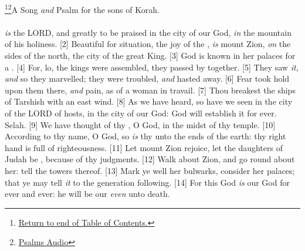 \footnote{\textcolor[cmyk]{0.99998,1,0,0}{\hyperlink{TOC}{Return to end of Table of Contents.}}}\footnote{\href{https://www.audioverse.org/english/audiobibles/books/ENGKJV/O/Ps/1}{\textcolor[cmyk]{0.99998,1,0,0}{Psalms Audio}}}\textcolor[cmyk]{0.99998,1,0,0}{A Song \emph{and} Psalm for the sons of Korah.}\\
\\
\textcolor[cmyk]{0.99998,1,0,0}{ \emph{is} the LORD, and greatly to be praised in the city of our God, \emph{in} the mountain of his holiness.}
[2] \textcolor[cmyk]{0.99998,1,0,0}{Beautiful for situation, the joy of the , \emph{is} mount Zion, \emph{on} the sides of the north, the city of the great King.}
[3] \textcolor[cmyk]{0.99998,1,0,0}{God is known in her palaces for a .}
[4] \textcolor[cmyk]{0.99998,1,0,0}{For, lo, the kings were assembled, they passed by together.}
[5] \textcolor[cmyk]{0.99998,1,0,0}{They saw \emph{it,} \emph{and} so they marvelled; they were troubled, \emph{and} hasted away.}
[6] \textcolor[cmyk]{0.99998,1,0,0}{Fear took hold upon them there, \emph{and} pain, as of a woman in travail.}
[7] \textcolor[cmyk]{0.99998,1,0,0}{Thou breakest the ships of Tarshish with an east wind.}
[8] \textcolor[cmyk]{0.99998,1,0,0}{As we have heard, so have we seen in the city of the LORD of hosts, in the city of our God: God will establish it for ever. Selah.}
[9] \textcolor[cmyk]{0.99998,1,0,0}{We have thought of thy , O God, in the midst of thy temple.}
[10] \textcolor[cmyk]{0.99998,1,0,0}{According to thy name, O God, so \emph{is} thy  unto the ends of the earth: thy right hand is full of righteousness.}
[11] \textcolor[cmyk]{0.99998,1,0,0}{Let mount Zion rejoice, let the daughters of Judah be , because of thy judgments.}
[12] \textcolor[cmyk]{0.99998,1,0,0}{Walk about Zion, and go round about her: tell the towers thereof.}
[13] \textcolor[cmyk]{0.99998,1,0,0}{Mark ye well her bulwarks, consider her palaces; that ye may tell \emph{it} to the generation following.}
[14] \textcolor[cmyk]{0.99998,1,0,0}{For this God \emph{is} our God for ever and ever: he will be our  \emph{even} unto death.}